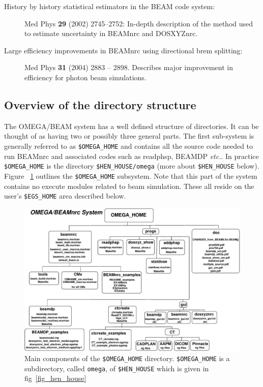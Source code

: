 \documentclass[12pt,twoside]{article}
\newcommand{\etc}{{\em etc.}}
\begin{document}
\begin{description}
\item[History by history statistical estimators in the BEAM code system:]
Med Phys {\bf 29} (2002) 2745--2752: In-depth description of the method used
to estimate uncertainty in BEAMnrc and DOSXYZnrc\cite{Wa02a}.

\item[Large efficiency improvements in BEAMnrc using directional
brem splitting:~~~] Med Phys {\bf 31} (2004) 2883 -- 2898. Describes
major improvement in efficiency for photon beam simulations\cite{Ka04a}.
 


\end{description}


\subsection{Overview of the directory structure}
\label{dirstructsect}

The OMEGA/BEAM system has a well defined structure of directories.  It
can be thought of as having two or possibly three general parts.  The
first sub-system is generally referred to as \verb+$OMEGA_HOME+ and
contains all the source code needed to run BEAMnrc and
associated codes such as readphsp, BEAMDP \etc.   In practice
\verb+$OMEGA_HOME+ is the directory {\tt \$HEN\_HOUSE/omega} (more
about {\tt \$HEN\_HOUSE} below).  Figure
~\ref{fig_omega_home} outlines the \verb+$OMEGA_HOME+ subsystem.
Note that this part of
the system contains no execute modules related to beam simulation.
These all reside on the user's {\tt \$EGS\_HOME} area described below.

\begin{figure}[hbp]
\begin{center}
\leavevmode
\mbox{}\hspace{0cm}
\includegraphics[width=17cm]{figures/omega_home}
\caption[Components of {\tt \$OMEGA\_HOME} subdirectory.]
{Main components of the {\tt \$OMEGA\_HOME} directory.
{\tt \$OMEGA\_HOME} is a subdirectory, called {\tt omega}, of
{\tt \$HEN\_HOUSE} which is given in fig~\ref{fig_hen_house}}
\label{fig_omega_home}
\end{center}
\end{figure}
\end{document}
